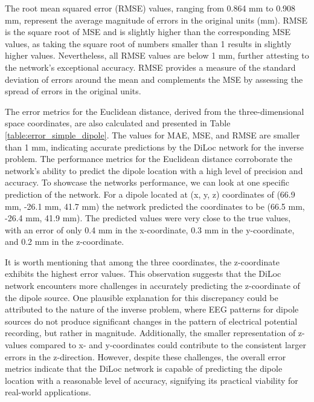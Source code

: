 \documentclass[a4paper, UKenglish, 11pt]{uiomaster}
\begin{document}
The root mean squared error (RMSE) values, ranging from 0.864 mm to 0.908 mm, represent the average magnitude of errors in the original units (mm). RMSE is the square root of MSE and is slightly higher than the corresponding MSE values, as taking the square root of numbers smaller than 1 results in slightly higher values. Nevertheless, all RMSE values are below 1 mm, further attesting to the network's exceptional accuracy. RMSE provides a measure of the standard deviation of errors around the mean and complements the MSE by assessing the spread of errors in the original units.

The error metrics for the Euclidean distance, derived from the three-dimensional space coordinates, are also calculated and presented in Table \ref{table:error_simple_dipole}. The values for MAE, MSE, and RMSE are smaller than 1 mm, indicating accurate predictions by the DiLoc network for the inverse problem. The performance metrics for the Euclidean distance corroborate the network's ability to predict the dipole location with a high level of precision and accuracy. To showcase the networks performance, we can look at one specific prediction of the network. For a dipole located at (x, y, z) coordinates of (66.9 mm, -26.1 mm, 41.7 mm) the network predicted the coordinates to be (66.5 mm, -26.4 mm, 41.9 mm). The predicted values were very close to the true values, with an error of only 0.4 mm in the x-coordinate, 0.3 mm in the y-coordinate, and 0.2 mm in the z-coordinate.

It is worth mentioning that among the three coordinates, the z-coordinate exhibits the highest error values. This observation suggests that the DiLoc network encounters more challenges in accurately predicting the z-coordinate of the dipole source. One plausible explanation for this discrepancy could be attributed to the nature of the inverse problem, where EEG patterns for dipole sources do not produce significant changes in the pattern of electrical potential recording, but rather in magnitude. Additionally, the smaller representation of z-values compared to x- and y-coordinates could contribute to the consistent larger errors in the z-direction. However, despite these challenges, the overall error metrics indicate that the DiLoc network is capable of predicting the dipole location with a reasonable level of accuracy, signifying its practical viability for real-world applications.
\end{document}
